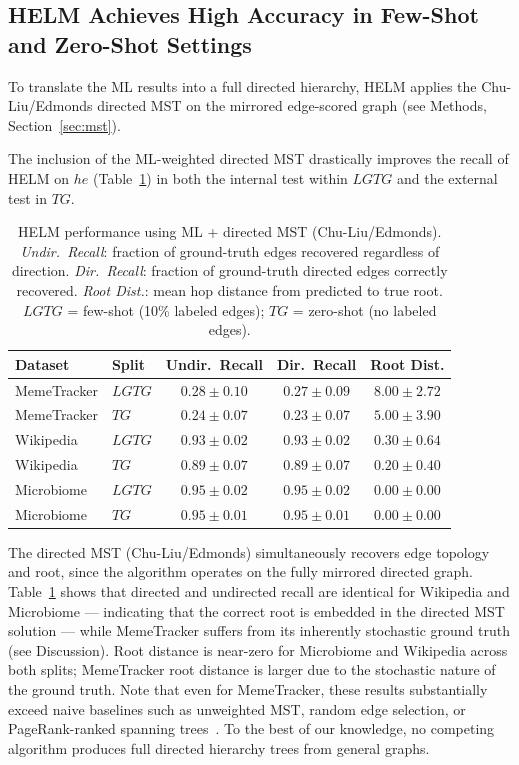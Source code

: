 \documentclass{article}
\begin{document}
    \subsection{HELM Achieves High Accuracy in Few-Shot and Zero-Shot Settings}
    To translate the ML results into a full directed hierarchy, HELM applies the Chu-Liu/Edmonds directed MST on the mirrored edge-scored graph (see Methods, Section~\ref{sec:mst}).

    The inclusion of the ML-weighted directed MST drastically improves the recall of HELM on $he$ (Table~\ref{tab:helm_recall}) in both the internal test within $LGTG$ and the external test in $TG$.

    \begin{table}[t]
        \centering
        \small
        \begin{tabular}{llccc}
            \toprule
            \textbf{Dataset} & \textbf{Split} & \textbf{Undir.\ Recall} & \textbf{Dir.\ Recall} & \textbf{Root Dist.} \\
            \midrule
            MemeTracker & $LGTG$ & $0.28\pm0.10$ & $0.27\pm0.09$ & $8.00\pm2.72$ \\
            MemeTracker & $TG$   & $0.24\pm0.07$ & $0.23\pm0.07$ & $5.00\pm3.90$ \\
            Wikipedia   & $LGTG$ & $0.93\pm0.02$ & $0.93\pm0.02$ & $0.30\pm0.64$ \\
            Wikipedia   & $TG$   & $0.89\pm0.07$ & $0.89\pm0.07$ & $0.20\pm0.40$ \\
            Microbiome  & $LGTG$ & $0.95\pm0.02$ & $0.95\pm0.02$ & $0.00\pm0.00$ \\
            Microbiome  & $TG$   & $0.95\pm0.01$ & $0.95\pm0.01$ & $0.00\pm0.00$ \\
            \bottomrule
        \end{tabular}
        \caption{HELM performance using ML + directed MST (Chu-Liu/Edmonds). \emph{Undir.\ Recall}: fraction of ground-truth edges recovered regardless of direction. \emph{Dir.\ Recall}: fraction of ground-truth directed edges correctly recovered. \emph{Root Dist.}: mean hop distance from predicted to true root. $LGTG$ = few-shot (10\% labeled edges); $TG$ = zero-shot (no labeled edges).}
        \label{tab:helm_recall}
    \end{table}

    The directed MST (Chu-Liu/Edmonds) simultaneously recovers edge topology and root, since the algorithm operates on the fully mirrored directed graph. Table~\ref{tab:helm_recall} shows that directed and undirected recall are identical for Wikipedia and Microbiome — indicating that the correct root is embedded in the directed MST solution — while MemeTracker suffers from its inherently stochastic ground truth (see Discussion). Root distance is near-zero for Microbiome and Wikipedia across both splits; MemeTracker root distance is larger due to the stochastic nature of the ground truth. Note that even for MemeTracker, these results substantially exceed naive baselines such as unweighted MST, random edge selection, or PageRank-ranked spanning trees~\citep{muchnik2007self,estrada2009communicability}. To the best of our knowledge, no competing algorithm produces full directed hierarchy trees from general graphs.
\end{document}
